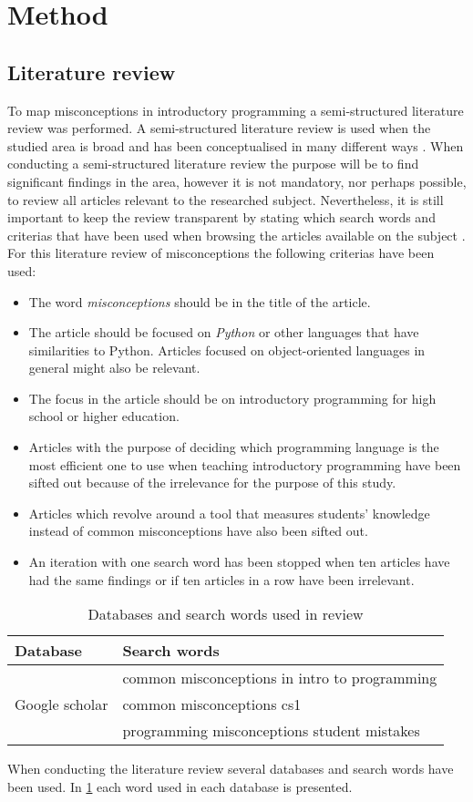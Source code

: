 \section{Method}
\subsection{Literature review}
To map misconceptions in introductory programming a semi-structured 
literature review was performed. A semi-structured literature review is used 
when the studied area is broad and has been conceptualised in many different 
ways \parencite{Snyder2019}. When conducting a semi-structured literature 
review the purpose will be to find significant findings in the area, however 
it is not mandatory, nor perhaps possible, to review all articles relevant 
to the researched subject. Nevertheless, it is still important to keep the 
review transparent by stating which search words and criterias that have 
been 
used when browsing the articles available on the subject 
\parencite{Snyder2019}.
For this literature review of misconceptions the following criterias have 
been used:
\begin{itemize}
\item The word \emph{misconceptions} should be in the title of the article.
\item The article should be focused on \emph{Python} or other languages that 
have similarities to Python. Articles focused on object-oriented languages 
in 
general might also be relevant.
\item The focus in the article should be on introductory programming for 
high 
school or higher education.
\item Articles with the purpose of deciding which programming language is 
the 
most efficient one to use when teaching introductory programming have been 
sifted out because of the irrelevance for the purpose of this study.
\item Articles which revolve around a tool that measures students' knowledge 
instead of common misconceptions have also been sifted out.
\item An iteration with one search word has been stopped when ten articles 
have had the same findings or if ten articles in a row have been irrelevant.
\end{itemize}
\begin{table}[h]
\centering
\begin{tabular}{ll}
\toprule
Database & Search words\\
\midrule
\multirow{3}{4em}{Google scholar} & common misconceptions in intro to 
programming \\
& common misconceptions cs1 \\
& programming misconceptions student mistakes \\
\bottomrule
\end{tabular}
\caption{Databases and search words used in review}
\label{databasesandwords}
\end{table}
When conducting the literature review several databases and search words 
have 
been used. In \cref{databasesandwords} each word used in each database is 
presented.

